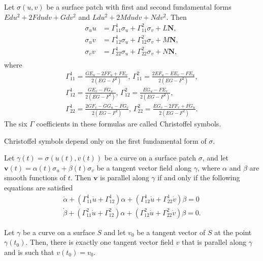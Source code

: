 \begin{proposition}
  Let $\sigma(u, v)$ be a surface patch with first and second fundamental
  forms
  $E du^2 + 2 F du dv + G dv^2$ and
  $L du^2 + 2 M du dv + N dv^2$.
  Then
  \begin{align*}
    \sigma_uu &= \Gamma_{11}^1 \sigma_u + \Gamma_{11}^2 \sigma_v + L \bm{N},\\
    \sigma_uv &= \Gamma_{12}^1 \sigma_u + \Gamma_{12}^2 \sigma_v + M \bm{N},\\
    \sigma_vv &= \Gamma_{22}^1 \sigma_u + \Gamma_{22}^2 \sigma_v + N \bm{N},\\
  \end{align*}
  where
  \begin{gather*}
    \Gamma_{11}^1 = \frac{GE_u - 2 F F_u + F E_v}{2(EG - F^2)}, \, \Gamma_{11}^2 = \frac{2EF_u - EE_v -FE_u}{2(EG - F^2)},\\
    \Gamma_{12}^1 = \frac{GE_v - FG_u}{2(EG - F^2)}, \, \Gamma_{12}^2 = \frac{EG_u - FE_v}{2(EG - F^2)},\\
    \Gamma_{22}^1 = \frac{2GF_v - GG_u - FG_v}{2(EG - F^2)}, \, \Gamma_{22}^2 = \frac{EG_v - 2FF_v + FG_u}{2(EG - F^2)}.
  \end{gather*}
  The six $\Gamma$ coefficients in these formulas are called Christoffel symbols.
\end{proposition}

\begin{note}
  Christoffel symbols depend only on the first fundamental form of $\sigma$.
\end{note}

\begin{proposition}
  Let $\gamma(t) = \sigma(u(t), v(t))$ be a curve on a surface patch
  $\sigma$, and let $\bm{v}(t) = \alpha(t) \sigma_u + \beta(t) \sigma_v$
  be a tangent vector field along $\gamma$, where $\alpha$ and $\beta$
  are smooth functions of $t$. Then $\bm{v}$ is parallel along
  $\gamma$ if and only if the following equations are satisfied
  \begin{align*}
    \dot{\alpha} + (\Gamma_{11}^1 \dot{u} + \Gamma_{12}^1)\alpha + (\Gamma_{12}^1 \dot{u} + \Gamma_{22}^1 \dot{v})\beta = 0\\
    \dot{\beta} + (\Gamma_{11}^2 \dot{u} + \Gamma_{12}^2)\alpha + (\Gamma_{12}^2 \dot{u} + \Gamma_{22}^2 \dot{v})\beta = 0.
  \end{align*}
\end{proposition}

\begin{corollary}
  Let $\gamma$ be a curve on a surface $S$ and let $v_0$ be a tangent
  vector of $S$ at the point $\gamma(t_0)$.
  Then, there is exactly one tangent vector field $v$ that is parallel
  along $\gamma$ and is such that $v(t_0) = v_0$.
\end{corollary}

